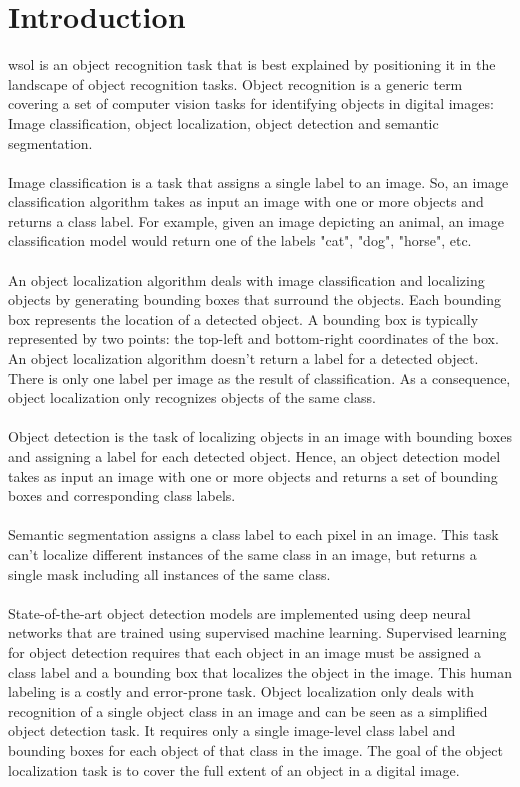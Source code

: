 \chapter{Introduction}

\acrfull{wsol} is an object recognition task that is best explained by positioning it in the landscape of object recognition tasks. Object recognition is a generic term covering a set of computer vision tasks for identifying objects in digital images: Image classification, object localization, object detection and semantic segmentation. 
\\\\
Image classification is a task that assigns a single label to an image. So, an image classification algorithm takes as input an image with one or more objects and returns a class label. For example, given an image depicting an animal, an image classification model would return one of the labels "cat", "dog", "horse", etc. 
\\\\
An object localization algorithm deals with image classification and localizing objects by generating bounding boxes that surround the objects. Each bounding box represents the location of a detected object. A bounding box is typically represented by two points: the top-left and bottom-right coordinates of the box. An object localization algorithm doesn't return a label for a detected object. There is only one label per image as the result of classification. As a consequence, object localization only recognizes objects of the same class.
\\\\
Object detection is the task of localizing objects in an image with bounding boxes and assigning a label for each detected object. Hence, an object detection model takes as input an image with one or more objects and returns a set of bounding boxes and corresponding class labels.
\\\\
Semantic segmentation assigns a class label to each pixel in an image. This task can't localize different instances of the same class in an image, but returns a single mask including all instances of the same class.
\\\\
State-of-the-art object detection models are implemented using deep neural networks that are trained using supervised machine learning. Supervised learning for object detection requires that each object in an image must be assigned a class label and a bounding box that localizes the object in the image. This human labeling is a costly and error-prone task. Object localization only deals with recognition of a single object class in an image and can be seen as a simplified object detection task. It requires only a single image-level class label and bounding boxes for each object of that class in the image. The goal of the object localization task is to cover the full extent of an object in a digital image.
